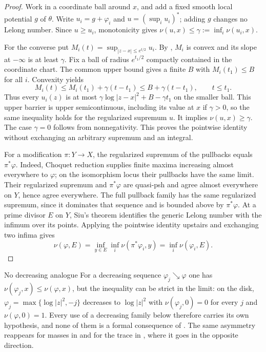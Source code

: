 \begin{proof}
Work in a coordinate ball around $x$, and add a fixed smooth local
potential $g$ of $\theta$.  Write $u_i=g+\varphi_i$ and
$u=(\sup_i u_i)^*$; adding $g$ changes no Lelong number.
Since $u\ge u_i$, monotonicity gives
$\nu(u,x)\le\gamma:=\inf_i\nu(u_i,x)$.

For the converse put $M_i(t)=\sup_{|z-x|\le e^{t/2}}u_i$.
By , $M_i$ is convex and its slope at
$-\infty$ is at least $\gamma$.  Fix a ball of radius $e^{t_1/2}$
compactly contained in the coordinate chart.  The common upper bound
gives a finite $B$ with $M_i(t_1)\le B$ for all $i$.  Convexity yields
\[
 M_i(t)\le M_i(t_1)+\gamma(t-t_1)
          \le B+\gamma(t-t_1),\qquad t\le t_1.
\]
Thus every $u_i(z)$ is at most
$\gamma\log|z-x|^2+B-\gamma t_1$ on the smaller ball.  This upper
barrier is upper semicontinuous, including its value at $x$ if
$\gamma>0$, so the same inequality holds for the regularized supremum
$u$.  It implies $\nu(u,x)\ge\gamma$.  The case $\gamma=0$ follows
from nonnegativity.  This proves the pointwise identity without
exchanging an arbitrary supremum and an integral.

For a modification $\pi:Y\to X$, the regularized supremum of the
pullbacks equals $\pi^*\varphi$.  Indeed, Choquet reduction supplies
finite maxima increasing almost everywhere to $\varphi$; on the
isomorphism locus their pullbacks have the same limit.  Their regularized
supremum and $\pi^*\varphi$ are quasi-psh and agree almost everywhere on
$Y$, hence agree everywhere.  The full pullback family has the same
regularized supremum, since it dominates that sequence and is bounded
above by $\pi^*\varphi$.
At a prime divisor $E$ on $Y$, Siu's theorem identifies the generic
Lelong number with the infimum over its points.  Applying the pointwise
identity upstairs and exchanging two infima gives
\[
 \nu(\varphi,E)=\inf_{y\in E}\inf_i\nu(\pi^*\varphi_i,y)
               =\inf_i\nu(\varphi_i,E).
\]
\end{proof}

\par\noindent\begin{minipage}{\textwidth}
\begin{warning}{No decreasing analogue}
\label{warn:ch51-lelong-decreasing}
For a decreasing sequence $\varphi_j\searrow\varphi$ one has
$\nu(\varphi_j,x)\leq\nu(\varphi,x)$, but the inequality can be strict
in the limit: on the disk, $\varphi_j=\max\{\log|z|^2,-j\}$ decreases to
$\log|z|^2$ with $\nu(\varphi_j,0)=0$ for every $j$ and
$\nu(\varphi,0)=1$.  Every use of a decreasing family below therefore
carries its own hypothesis, and none of them is a formal consequence of
.  The same asymmetry reappears for
masses in  and for the trace in
, where it goes in the opposite
direction.
\end{warning}
\end{minipage}\par\medskip

